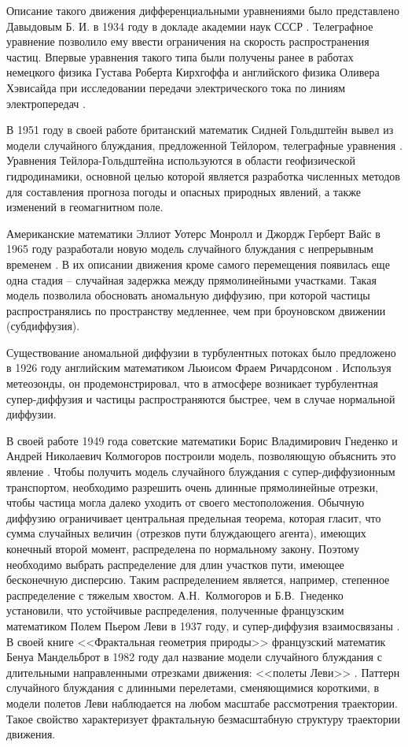 Описание такого движения дифференциальными уравнениями было представлено Давыдовым Б. И. в 1934 году в докладе академии наук СССР \cite{davydov_diffusion_1934}. Телеграфное уравнение позволило ему ввести ограничения на скорость распространения частиц. Впервые уравнения такого типа были получены ранее в работах немецкого физика Густава Роберта Кирхгоффа и английского физика Оливера Хэвисайда при исследовании передачи электрического тока по линиям электропередач \cite{kirchhoff_ueber_1857}.

В 1951 году в своей работе британский математик Сидней Гольдштейн вывел из модели случайного блуждания, предложенной Тейлором, телеграфные уравнения \cite{goldstein_diffusion_1951}. Уравнения Тейлора-Гольдштейна используются в области геофизической гидродинамики, основной целью которой является разработка численных методов для составления прогноза погоды и опасных природных явлений, а также изменений в геомагнитном поле.

Американские математики Эллиот Уотерс Монролл и Джордж Герберт Вайс в 1965 году разработали новую модель случайного блуждания с непрерывным временем \cite{montroll_random_1965}. В их описании движения кроме самого перемещения появилась еще одна стадия -- случайная задержка между прямолинейными участками. Такая модель позволила обосновать аномальную диффузию, при которой частицы распространялись по пространству медленнее, чем при броуновском движении (субдиффузия).

Существование аномальной диффузии в турбулентных потоках было предложено в 1926 году английским математиком Льюисом Фраем Ричардсоном \cite{richardson_atmospheric_1997}. Используя метеозонды, он продемонстрировал, что в атмосфере возникает турбулентная супер-диффузия и частицы распространяются быстрее, чем в случае нормальной диффузии.

В своей работе 1949 года советские математики Борис Владимирович Гнеденко и Андрей Николаевич Колмогоров построили модель, позволяющую объяснить это явление \cite{gnedenko_predelnye_1949}. Чтобы получить модель случайного блуждания с супер-диффузионным транспортом, необходимо разрешить очень длинные прямолинейные отрезки, чтобы частица могла далеко уходить от своего местоположения. Обычную диффузию ограничивает центральная предельная теорема, которая гласит, что сумма случайных величин (отрезков пути блуждающего агента), имеющих конечный второй момент, распределена по нормальному закону. Поэтому необходимо выбрать распределение для длин участков пути, имеющее бесконечную дисперсию. Таким распределением является, например, степенное распределение с тяжелым хвостом. А.Н.~Колмогоров и Б.В.~Гнеденко установили, что устойчивые распределения, полученные французским математиком Полем Пьером Леви в 1937 году, и супер-диффузия взаимосвязаны \cite{levy_theorie_1937}. В своей книге <<Фрактальная геометрия природы>> французский математик Бенуа Мандельброт в 1982 году дал название модели случайного блуждания с длительными направленными отрезками движения: <<полеты Леви>> \cite{mandelbrot_fractal_1983}. Паттерн случайного блуждания с длинными перелетами, сменяющимися короткими, в модели полетов Леви наблюдается на любом масштабе рассмотрения траектории. Такое свойство характеризует фрактальную безмасштабную структуру траектории движения.

